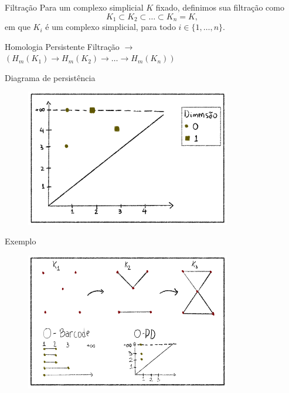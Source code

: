 \documentclass[10pt]{beamer}
\begin{document}
\begin{frame}{Filtração}
    Para um complexo simplicial $K$ fixado, definimos sua filtração como 
    \begin{equation*}
        K_1 \subset K_2 \subset \dots \subset K_n = K,
    \end{equation*}
    em que $K_i$ é um complexo simplicial, para todo $i \in \{1, \dots, n\}$. 
\end{frame}

\begin{frame}{Homologia Persistente}
    \centering
    {\Large Filtração $\rightarrow$ $(H_m(K_1) \to H_m(K_2) \to \dots \to H_m(K_n))$}
\end{frame}

\begin{frame}{Diagrama de persistência} 
     \begin{figure}
        \centering
        \includegraphics[width=0.8\textwidth]{../images/persdiag_ex.png}
    \end{figure}   
\end{frame}

\begin{frame}{Exemplo}
    \begin{figure}
        \centering
        \includegraphics[width=0.8\textwidth]{../images/filt_bar_pd.png}
    \end{figure}
\end{frame}
\end{document}
